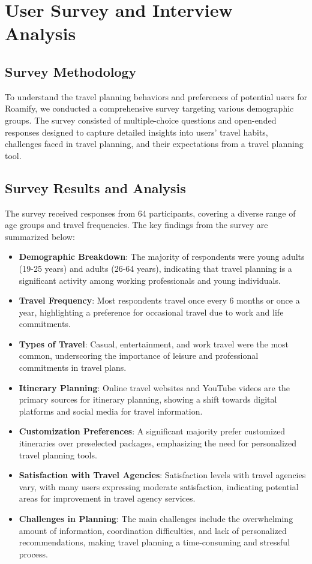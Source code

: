 \documentclass[conference]{IEEEtran}
\begin{document}
\section{User Survey and Interview Analysis}

    \subsection{Survey Methodology}
        To understand the travel planning behaviors and preferences of potential users for Roamify, we conducted a comprehensive survey targeting various demographic groups. The survey consisted of multiple-choice questions and open-ended responses designed to capture detailed insights into users' travel habits, challenges faced in travel planning, and their expectations from a travel planning tool.
        
    \subsection{Survey Results and Analysis}
        The survey received responses from 64 participants, covering a diverse range of age groups and travel frequencies. The key findings from the survey are summarized below:
        
        \begin{itemize}
            \item \textbf{Demographic Breakdown}: The majority of respondents were young adults (19-25 years) and adults (26-64 years), indicating that travel planning is a significant activity among working professionals and young individuals.
            \item \textbf{Travel Frequency}: Most respondents travel once every 6 months or once a year, highlighting a preference for occasional travel due to work and life commitments.
            \item \textbf{Types of Travel}: Casual, entertainment, and work travel were the most common, underscoring the importance of leisure and professional commitments in travel plans.
            \item \textbf{Itinerary Planning}: Online travel websites and YouTube videos are the primary sources for itinerary planning, showing a shift towards digital platforms and social media for travel information.
            \item \textbf{Customization Preferences}: A significant majority prefer customized itineraries over preselected packages, emphasizing the need for personalized travel planning tools.
            \item \textbf{Satisfaction with Travel Agencies}: Satisfaction levels with travel agencies vary, with many users expressing moderate satisfaction, indicating potential areas for improvement in travel agency services.
            \item \textbf{Challenges in Planning}: The main challenges include the overwhelming amount of information, coordination difficulties, and lack of personalized recommendations, making travel planning a time-consuming and stressful process.
        \end{itemize}
        
\end{document}
